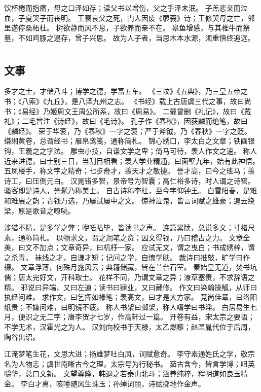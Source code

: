 \documentclass[12pt,UTF8]{ctexbook}
\begin{document}
饮杯棬而抱痛，母之口泽如存；读父书以增伤，父之手泽未泯。
子羔悲亲而泣血，子夏哭子而丧明。
王裒哀父之死，门人因废《蓼莪》诗；王修哭母之亡，邻里遂停桑柘杜。
树欲静而风不息，子欲养而亲不在。
皋鱼增感，与其椎牛而祭墓，不如鸡豚之逮存，曾子兴思。
故为人子者，当思木本水源，须重慎终追远。

\part{}

\chapter{文事}

多才之士，才储八斗；博学之德，学富五车。
《三坟》《五典》，乃三皇五帝之书；《八索》《九丘》，是八泽九州之志。
《书经》载上古唐虞三代之事，故曰尚书；《易经》乃姬周文王周公所系，故曰《周易》。
二戴曾删《礼记》，故曰《戴礼》；二毛曾注《诗经》，故曰《毛诗》。
孔子作《春秋》，因获麟而绝笔，故曰《麟经》。
荣于华衮，乃《春秋》一字之褒；严于斧钺，乃《春秋》一字之贬。
缣缃黄卷，总谓经书；雁帛鸾笺，通称简札。
锦心绣口，李太白之文章；铁画银钩，王羲之之字法。
雕虫小技，自谦文学之卑；倚马可待，羡人作文之速。
称人近来进德，曰士别三日，当刮目相看；羡人学业精通，曰面壁九年，始有此神悟。
五凤楼手，称文字之精奇；七步奇才，羡天才之敏捷。
誉才高，曰今之班马；羡诗工，曰压倒元白。
汉晁错多智，景帝号为智囊；高仁裕多诗，时人谓之诗窖。
骚客即是诗人，誉髦乃称美士。
自古诗称李杜，至今字仰钟王。
白雪阳春，是难和难赓之韵；青钱万选，乃屡试屡中之文。
惊神泣鬼，皆言词赋之雄豪；遏云绕梁，原是歌音之嘹喨。

涉猎不精，是多学之弊；咿唔呫毕，皆读书之声。
连篇累牍，总说多文；寸楮尺素，通称简札。
以物求文，谓之润笔之资；因文得钱，乃曰稽古之力。
文章全美，曰文不加点；文章奇异，曰机杼一家。
应试无文，谓之曳白；书成绣梓，谓之杀青。
袜线之才，自谦才短；记问之学，自愧学肤。
裁诗曰推敲，旷学曰作辍。
文章浮薄，何殊月露风云；典籍储藏，皆在兰台石室。
秦始皇无道，焚书坑儒；唐太完好文，开科取士。
花样不同，乃谓文章之异；潦草塞责，不求辞语之精。
邪说曰异端，又曰左道；读书曰肄业，又曰藏修。
作文曰染翰操觚，从师曰执经问难。
求作文，曰乞挥如椽笔；羡高文，曰才是大方家。
竞尚佳章，曰洛阳纸贵；不嫌问难，曰明镜不疲。
称人书架曰邺架，称人嗜学曰书淫。
白居易生七月，便识之无二字；唐李贺才七岁，作高轩过一篇。
开卷有益，宋太宗之要语；不学无术，汉霍光之为人。
汉刘向校书于天禄，太乙燃藜；赵匡胤代位于后周，陶谷出诏。

江淹梦笔生花，文思大进；扬雄梦吐白凤，词赋愈奇。
李守素通姓氏之学，敬宗名为人物志；虞世南晰古今之理，太宗号为行秘书。
茹古含今，皆言学博；咀英嚼华，总曰文新。
文望尊隆，韩退之若泰山北斗；涵养纯粹，程明道如良玉精金。
李白才离，咳唾随风生珠玉；孙绰词丽，诗赋掷地作金声。
\end{document}

